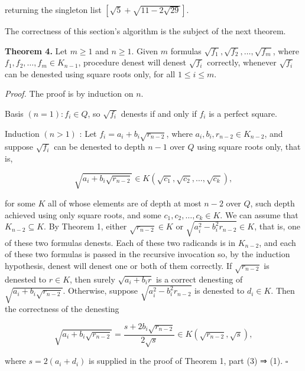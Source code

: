 \documentclass[11pt,letterpaper]{article}
\begin{document}
returning the singleton list $[\sqrt{5}+\sqrt{11-2 \sqrt{29}}]$.

The correctness of this section's algorithm is the subject of the next theorem.

\noindent\textbf{Theorem 4.} Let $m \geqslant 1$ and $n \geqslant 1$. Given $m$ formulas $\sqrt{f_{1}}, \sqrt{f_{2}}, \ldots, \sqrt{f_{m}}$, where $f_{1}, f_{2}, \ldots, f_{m} \in K_{n-1}$, procedure denest will denest $\sqrt{f_{i}}$ correctly, whenever $\sqrt{f_{i}}$ can be denested using square roots only, for all $1 \leqslant i \leqslant m$.

\noindent\textit{Proof.} The proof is by induction on $n$.

Basis $(n=1): f_{i} \in Q$, so $\sqrt{f_{i}}$ denests if and only if $f_{i}$ is a perfect square.

Induction $(n>1)$ : Let $f_{i}=a_{i}+b_{i} \sqrt{r_{n-2}}$, where $a_{i}, b_{i}, r_{n-2} \in K_{n-2}$, and suppose $\sqrt{f_{i}}$ can be denested to depth $n-1$ over $Q$ using square roots only, that is,

\[
\sqrt{a_{i}+b_{i} \sqrt{r_{n-2}}} \in K\left(\sqrt{c_{1}}, \sqrt{c_{2}}, \ldots, \sqrt{c_{k}}\right),
\]

for some $K$ all of whose elements are of depth at most $n-2$ over $Q$, such depth achieved using only square roots, and some $c_{1}, c_{2}, \ldots, c_{k} \in K$. We can assume that $K_{n-2} \subseteq K$. By Theorem 1, either $\sqrt{r_{n-2}} \in K$ or $\sqrt{a_{i}^{2}-b_{i}^{2} r_{n-2}} \in K$, that is, one of these two formulas denests. Each of these two radicands is in $K_{n-2}$, and each of these two formulas is passed in the recursive invocation so, by the induction hypothesis, denest will denest one or both of them correctly. If $\sqrt{r_{n-2}}$ is denested to $r \in K$, then surely $\sqrt{a_{i}+b_{i} r}$ is a correct denesting of $\sqrt{a_{i}+b_{i} \sqrt{r_{n-2}}}$. Otherwise, suppose $\sqrt{a_{i}^{2}-b_{i}^{2} r_{n-2}}$ is denested to $d_{i} \in K$. Then the correctness of the denesting

\[
\sqrt{a_{i}+b_{i} \sqrt{r_{n-2}}}=\frac{s+2b_i\sqrt{r_{n-2}}}{2 \sqrt{s}} \in K\left(\sqrt{r_{n-2}}, \sqrt{s}\right),
\]

where $s=2\left(a_{i}+d_{i}\right)$ is supplied in the proof of Theorem 1, part (3) ⇒ (1). \(\square\)
\end{document}

